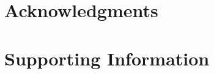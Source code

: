 \documentclass[10pt,letterpaper]{article}
\begin{document}
\section*{Acknowledgments}


\section*{Supporting Information}



%
%


\end{document}
